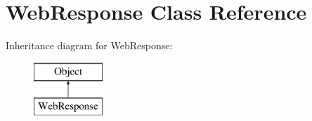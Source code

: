 \hypertarget{class_web_response}{\section{Web\-Response Class Reference}
\label{class_web_response}
}
Inheritance diagram for Web\-Response\-:\begin{figure}[H]
\begin{center}
\leavevmode
\includegraphics[height=2.000000cm]{class_web_response}
\end{center}
\end{figure}
